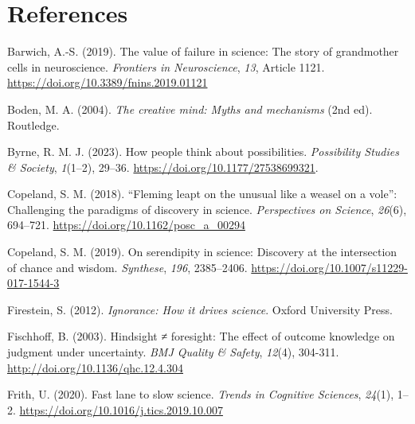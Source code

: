 \documentclass[authordate, commentary]{jote-new-article}
\begin{document}
  





	\section{References}







	Barwich, A.-S. (2019). The value of failure in science: The story of grandmother cells in neuroscience. \emph{Frontiers in Neuroscience}, \emph{13}, Article 1121. \href{https://doi.org/10.3389/fnins.2019.01121}{https://doi.org/10.3389/fnins.2019.01121}



	Boden, M. A. (2004). \emph{The creative mind: Myths and mechanisms} (2nd ed). Routledge.



	Byrne, R. M. J. (2023). How people think about possibilities. \emph{Possibility Studies \& Society}, \emph{1}(1--2), 29--36. \href{https://doi.org/10.1177/27538699321}{https://doi.org/10.1177/27538699321}.



	Copeland, S. M. (2018). “Fleming leapt on the unusual like a weasel on a vole”: Challenging the paradigms of discovery in science. \emph{Perspectives on Science}, \emph{26}(6), 694--721. \href{https://doi.org/10.1162/posc\_a\_00294}{https://doi.org/10.1162/posc\_a\_00294}



	Copeland, S. M. (2019). On serendipity in science: Discovery at the intersection of chance and wisdom. \emph{Synthese}, \emph{196}, 2385--2406. \href{https://doi.org/10.1007/s11229-017-1544-3}{https://doi.org/10.1007/s11229-017-1544-3}



	Firestein, S. (2012). \emph{Ignorance: How it drives science}. Oxford University Press.



	Fischhoff, B. (2003). Hindsight ≠ foresight: The effect of outcome knowledge on judgment under uncertainty. \emph{BMJ Quality \& Safety}, \emph{12}(4), 304-311. \href{http://doi.org/10.1136/qhc.12.4.304Frith}{http://doi.org/10.1136/qhc.12.4.304}
	
	Frith, U. (2020). Fast lane to slow science. \emph{Trends in Cognitive Sciences}, \emph{24}(1), 1--2. \href{https://doi.org/10.1016/j.tics.2019.10.007}{https://doi.org/10.1016/j.tics.2019.10.007}
\end{document}
